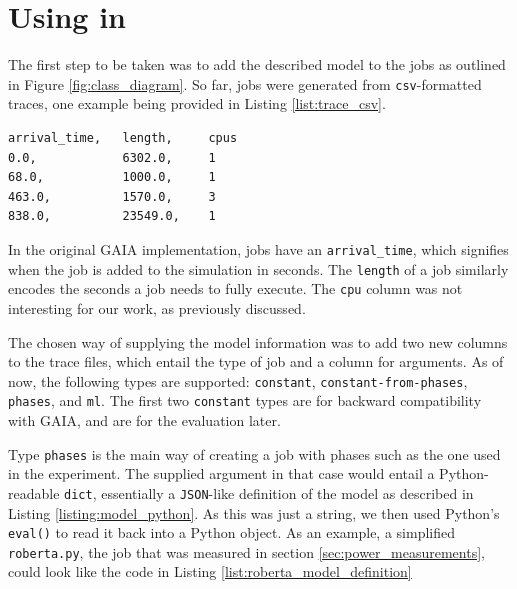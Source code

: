 \section{Using \modelname{} in \programname{}}

The first step to be taken was to add the described model to the jobs as outlined in Figure \ref{fig:class_diagram}. 
So far, jobs were generated from \verb|csv|-formatted traces, one example being provided in Listing \ref{list:trace_csv}.

\begin{minipage}{\linewidth}
\begin{lstlisting}[frame=single, numbers=none, caption={Excerpt from the Alibaba-PAI trace}, label={list:trace_csv}, basicstyle=\ttfamily]
arrival_time,   length,     cpus
0.0,            6302.0,     1
68.0,           1000.0,     1
463.0,          1570.0,     3
838.0,          23549.0,    1
\end{lstlisting}
\end{minipage}

In the original GAIA implementation, jobs have an \verb|arrival_time|, which signifies when the job is added to the simulation in seconds. 
The \verb|length| of a job similarly encodes the seconds a job needs to fully execute. The \verb|cpu| column was not interesting for our work, as previously discussed.

The chosen way of supplying the model information was to add two new columns to the trace files, which entail the type of job and a column for arguments. 
As of now, the following types are supported: \verb|constant|, \verb|constant-from-phases|, \verb|phases|, and \verb|ml|. 
The first two \verb|constant| types are for backward compatibility with GAIA, and are for the evaluation later.

Type \verb|phases| is the main way of creating a job with phases such as the one used in the experiment. The supplied argument in that case would entail a Python-readable \verb|dict|, essentially a \verb|JSON|-like definition of the model as described in Listing \ref{listing:model_python}.
As this was just a string, we then used Python's \verb|eval()| to read it back into a Python object.
As an example, a simplified \verb|roberta.py|, the job that was measured in section \ref{sec:power_measurements}, could look like the code in Listing \ref{list:roberta_model_definition}

